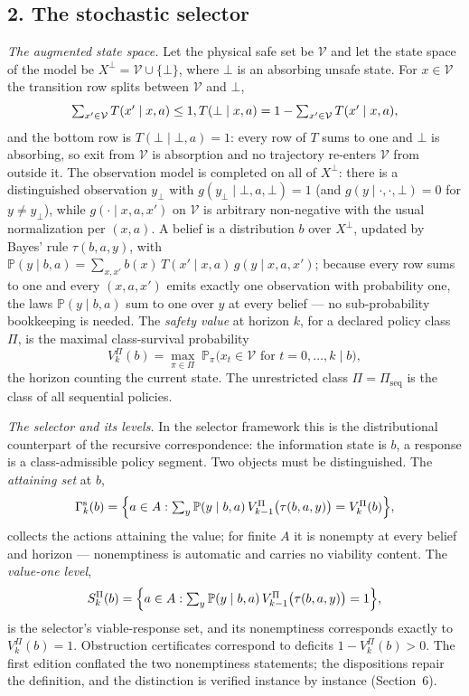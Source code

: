\documentclass[10pt,twocolumn]{article}
\theoremstyle{definition}
\begin{document}
\subsection{2. The stochastic selector}\label{model}

\emph{The augmented state space.} Let the physical safe set be
\(\mathcal{V}\) and let the state space of the model be
\(X^{\perp} = \mathcal{V} \cup \{\bot\}\), where \(\bot\) is an absorbing
unsafe state. For \(x \in \mathcal{V}\) the transition row splits between
\(\mathcal{V}\) and \(\bot\),
\[
\textstyle\sum_{x' \in \mathcal{V}} T(x' \mid x, a) \le 1,\\
T(\bot \mid x, a) = 1 - \sum_{x' \in \mathcal{V}} T(x' \mid x, a),
\]
and the bottom row is \(T(\bot \mid \bot, a) = 1\): every row of \(T\)
sums to one and \(\bot\) is absorbing, so exit from \(\mathcal{V}\) is
absorption and no trajectory re-enters \(\mathcal{V}\) from outside it.
The observation model is completed on all of \(X^{\perp}\): there is a
distinguished observation \(y_{\bot}\) with
\(g(y_{\bot} \mid \bot, a, \bot) = 1\) (and \(g(y \mid \cdot, \cdot, \bot)
= 0\) for \(y \ne y_{\bot}\)), while \(g(\cdot \mid x, a, x')\) on
\(\mathcal{V}\) is arbitrary non-negative with the usual normalization
per \((x, a)\). A belief is a distribution \(b\) over \(X^{\perp}\),
updated by Bayes' rule \(\tau(b, a, y)\), with
\(\mathbb{P}(y \mid b, a) = \sum_{x, x'} b(x)\, T(x' \mid x, a)\,
g(y \mid x, a, x')\); because every row sums to one and every
\((x, a, x')\) emits exactly one observation with probability one, the
laws \(\mathbb{P}(y \mid b, a)\) sum to one over \(y\) at every belief —
no sub-probability bookkeeping is needed. The \emph{safety value} at
horizon \(k\), for a declared policy class \(\Pi\), is the maximal
class-survival probability
\[
V^{\Pi}_{k}(b) = \max_{\pi \in \Pi}\; \mathbb{P}_{\pi}\bigl( x_{t} \in
\mathcal{V} \text{ for } t = 0, \dots, k \;\big|\; b \bigr),
\]
the horizon counting the current state. The unrestricted class
\(\Pi = \Pi_{\mathrm{seq}}\) is the class of all sequential policies.

\emph{The selector and its levels.} In the selector framework this is the
distributional counterpart of the recursive correspondence: the
information state is \(b\), a response is a class-admissible policy
segment. Two objects must be distinguished. The \emph{attaining set} at
\(b\),
\[
\Gamma^{\mathrm{s}}_{k}(b) = \Bigl\{ a \in A : \textstyle\sum_{y}
\mathbb{P}(y \mid b, a)\, V^{\Pi}_{k-1}\bigl(\tau(b, a, y)\bigr)
= V^{\Pi}_{k}(b) \Bigr\},
\]
collects the actions attaining the value; for finite \(A\) it is nonempty
at every belief and horizon — nonemptiness is automatic and carries no
viability content. The \emph{value-one level},
\[
S^{\Pi}_{k}(b) = \Bigl\{ a \in A : \textstyle\sum_{y} \mathbb{P}(y \mid
b, a)\, V^{\Pi}_{k-1}\bigl(\tau(b, a, y)\bigr) = 1 \Bigr\},
\]
is the selector's viable-response set, and its nonemptiness corresponds
exactly to \(V^{\Pi}_{k}(b) = 1\). Obstruction certificates correspond to
deficits \(1 - V^{\Pi}_{k}(b) > 0\). The first edition conflated the two
nonemptiness statements; the dispositions repair the definition, and the
distinction is verified instance by instance (Section~6).
\end{document}
